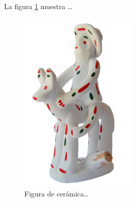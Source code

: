 \documentclass{article}
\begin{document}
La figura \ref{fig:siurell} muestra \ldots

\begin{figure}
\centering
\includegraphics[width=0.5\textwidth]{siurellp}
\caption{\label{fig:siurell}Figura de cerámica\ldots}
\end{figure}
\end{document}
